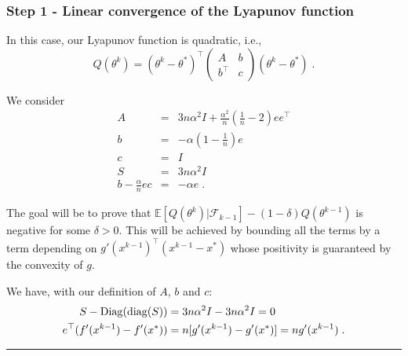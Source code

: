 \documentclass{article}
\newcommand{\BEAS}{\begin{eqnarray*}}
\newcommand{\EEAS}{\end{eqnarray*}}
\newcommand{\diag}{\mathop{\rm diag}}
\newcommand{\Diag}{\mathop{\rm Diag}}
\newcommand{\idm}{I}
\newcommand{\BlackBox}{\rule{1.5ex}{1.5ex}}  %
\newenvironment{proof}{\par\noindent{\bf Proof\ }}{\hfill\BlackBox\\[2mm]}
\def\diag{\operatorname{diag}}
\def\E{_{\scriptscriptstyle E}}
\def \E{{\mathbb E}}
\def \E{{\mathbb E}}
\begin{document}
\begin{proof}
\subsubsection*{Step 1 - Linear convergence of the Lyapunov function}
In this case, our Lyapunov function is quadratic, i.e.,
\[
Q(\theta^k) = (\theta^k - \theta^*)^\top \left(\begin{array}{cc} A & b \\ b^\top & c \end{array}\right) (\theta^k - \theta^*) \; .
\]

We consider
\BEAS
A & = & 3n \alpha^2 \idm + \frac{\alpha^2}{n} (\frac{1}{n} - 2 )ee^\top \\
b & = & - \alpha ( 1 - \frac{1}{n}) e \\
c & = & \idm \\
S & = & 3 n \alpha^2 \idm \\
b - \frac{\alpha}{n} e c & = & - \alpha e \; .
\EEAS

The goal will be to prove that $\E [ Q(\theta^k) | \mathcal{F}_{k-1} ] - ( 1 - \delta)Q(\theta^{k-1})$ is negative for some $\delta > 0$. This will be achieved by bounding all the terms by a term depending on $g'(x^{k-1})^\top( x^{k-1} - x^{\ast})$ whose positivity is guaranteed by the convexity of $g$.

We have, with our definition of $A$, $b$ and $c$:
\begin{align*}
S - \Diag(\diag(S)) &= 3 n \alpha^2 \idm - 3 n \alpha^2 \idm = 0\\
e^\top (f'(x^{k-1}) - f'(x^\ast)) &= n[g'(x^{k-1}) - g'(x^\ast)] = ng'(x^{k-1}) \; .
\end{align*}


\end{proof}
\end{document}

